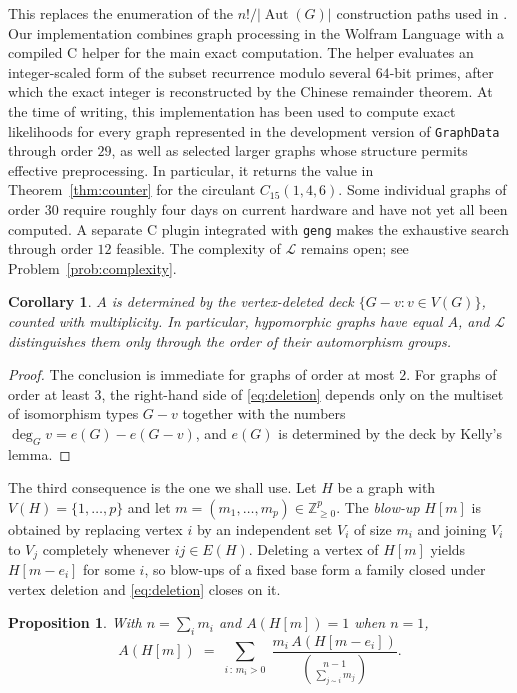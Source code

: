 \documentclass[11pt]{article}
\newtheorem{proposition}[theorem]{Proposition}
\newtheorem{corollary}[theorem]{Corollary}
\theoremstyle{definition}
\DeclareMathOperator{\Aut}{Aut}
\newcommand{\Lk}{\mathcal{L}}
\newcommand{\bin}[2]{\binom{#1}{#2}}
\begin{document}
This replaces the enumeration of the $n!/\lvert\Aut(G)\rvert$ construction paths used in \cite{BMS14}. Our implementation combines graph processing in the Wolfram Language with a compiled C helper for the main exact computation. The helper evaluates an integer-scaled form of the subset recurrence modulo several $64$-bit primes, after which the exact integer is reconstructed by the Chinese remainder theorem. At the time of writing, this implementation has been used to compute exact likelihoods for every graph represented in the development version of \texttt{GraphData} \cite{GraphData} through order $29$, as well as selected larger graphs whose structure permits effective preprocessing. In particular, it returns the value in Theorem~\ref{thm:counter} for the circulant $C_{15}(1,4,6)$. Some individual graphs of order $30$ require roughly four days on current hardware and have not yet all been computed. A separate C plugin integrated with \texttt{geng} makes the exhaustive search through order $12$ feasible. The complexity of $\Lk$ remains open; see Problem~\ref{prob:complexity}.

\begin{corollary}\label{cor:deck}
$A$ is determined by the vertex-deleted deck $\{G-v: v\in V(G)\}$, counted with multiplicity. In particular, hypomorphic graphs have equal $A$, and $\Lk$ distinguishes them only through the order of their automorphism groups.
\end{corollary}

\begin{proof}
The conclusion is immediate for graphs of order at most $2$. For graphs of order at least $3$, the right-hand side of \eqref{eq:deletion} depends only on the multiset of isomorphism types $G-v$ together with the numbers $\deg_Gv=e(G)-e(G-v)$, and $e(G)$ is determined by the deck by Kelly's lemma.
\end{proof}

The third consequence is the one we shall use. Let $H$ be a graph with $V(H)=\{1,\dots,p\}$ and let $m=(m_1,\dots,m_p)\in\mathbb{Z}_{\ge0}^p$. The \emph{blow-up} $H[m]$ is obtained by replacing vertex $i$ by an independent set $V_i$ of size $m_i$ and joining $V_i$ to $V_j$ completely whenever $ij\in E(H)$. Deleting a vertex of $H[m]$ yields $H[m-e_i]$ for some $i$, so blow-ups of a fixed base form a family closed under vertex deletion and \eqref{eq:deletion} closes on it.

\begin{proposition}\label{prop:blowup}
With $n=\sum_im_i$ and $A(H[m])=1$ when $n=1$,
\begin{equation}\label{eq:blowup}
A(H[m])\;=\;\sum_{i\,:\,m_i>0}\;\frac{m_i\,A(H[m-e_i])}{\bin{n-1}{\sum_{j\sim i}m_j}} .
\end{equation}
\end{proposition}
\end{document}

